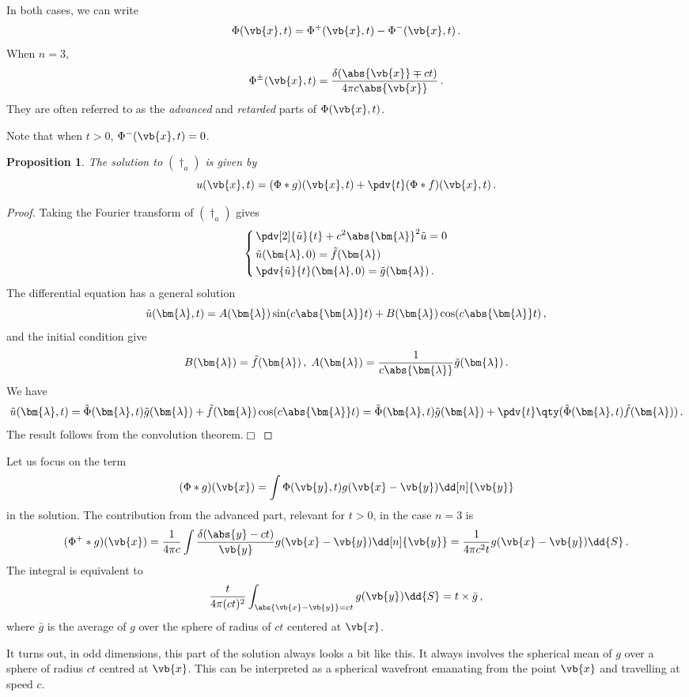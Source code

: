 \documentclass{article}
\theoremstyle{plain}\theoremheaderfont{\normalfont\itshape}\theorembodyfont{\rmfamily}\theoremseparator{.}\newtheorem*{rem}{Remark}\newtheorem*{ex}{Example}\newtheorem*{proof}{Proof}\newtheorem*{altp}{Alternative proof}
\theoremstyle{plain}\theoremheaderfont{\normalfont\bfseries}\theorembodyfont{\rmfamily}\theoremseparator{.}\newtheorem{thm}{Theorem}[section]\newtheorem{lem}[thm]{Lemma}\newtheorem{prop}[thm]{Proposition}\newtheorem*{cor}{Corollary}\newtheorem{defn}[thm]{Definition}\newtheorem{clm}[thm]{Claim}\newtheorem{clminproof}{Claim}
\theoremstyle{break}\theoremheaderfont{\normalfont\itshape}\theorembodyfont{\rmfamily}\theoremseparator{.\medskip}\newtheorem*{proofskip}{Proof}\newtheorem*{exs}{Examples}\newtheorem*{rems}{Remarks}
\theoremstyle{break}\theoremheaderfont{\normalfont\bfseries}\theorembodyfont{\rmfamily}\theoremseparator{.\medskip}\newtheorem{lemskip}[thm]{Lemma}\newtheorem{defnskip}[thm]{Definition}\newtheorem{propskip}[thm]{Proposition}\newtheorem{thmskip}[thm]{Theorem}
\numberwithin{equation}{section}
\newcommand{\qed}{\hfill\ensuremath{\Box}}
\newcommand{\bl}{\bm{\lambda}}
\begin{document}
	In both cases, we can write
	\[\Phi(\vb{x},t)=\Phi^+(\vb{x},t)-\Phi^-(\vb{x},t)\,.\]
	When \(n=3\),
	\[\Phi^\pm(\vb{x},t)=\frac{\delta(\abs{\vb{x}}\mp ct)}{4\pi c\abs{\vb{x}}}\,.\]
	They are often referred to as the \textit{advanced} and \textit{retarded} parts of \(\Phi(\vb{x},t)\). 

	Note that when \(t>0\), \(\Phi^-(\vb{x},t)=0\).
	
	\begin{prop}
		The solution to \((\dagger_a)\) is given by
		\[u(\vb{x},t)=(\Phi*g)(\vb{x},t)+\pdv{t}(\Phi*f)(\vb{x},t)\,.\]
	\end{prop}
	\begin{proof}
		Taking the Fourier transform of \((\dagger_a)\) gives
		\[\left\{\begin{aligned}
			&\,\pdv[2]{\tilde{u}}{t}+c^2\abs{\bl}^2\tilde{u}=0\\
			&\,\tilde{u}(\bl,0)=\tilde{f}(\bl)\\
			&\,\pdv{\tilde{u}}{t}(\bl,0)=\tilde{g}(\bl)\,.
		\end{aligned}\right.\]
		The differential equation has a general solution
		\[\tilde{u}(\bl,t)=A(\bl)\sin(c\abs{\bl}t)+B(\bl)\cos(c\abs{\bl}t)\,,\]
		and the initial condition give
		\[B(\bl)=\tilde{f}(\bl)\,,\;A(\bl)=\frac{1}{c\abs{\bl}}\tilde{g}(\bl)\,.\]
		We have
		\[\tilde{u}(\bl,t)=\tilde{\Phi}(\bl,t)\tilde{g}(\bl)+\tilde{f}(\bl)\cos(c\abs{\bl}t)=\tilde{\Phi}(\bl,t)\tilde{g}(\bl)+\pdv{t}\qty(\tilde{\Phi}(\bl,t)\tilde{f}(\bl))\,.\]
		The result follows from the convolution theorem.\qed
	\end{proof}

	Let us focus on the term
	\[(\Phi*g)(\vb{x})=\int\Phi(\vb{y},t)g(\vb{x}-\vb{y})\dd[n]{\vb{y}}\]
	in the solution. The contribution from the advanced part, relevant for \(t>0\), in the case \(n=3\) is
	\[(\Phi^+*g)(\vb{x})=\frac{1}{4\pi c}\int\frac{\delta(\abs{y}-ct)}{\vb{y}}g(\vb{x}-\vb{y})\dd[n]{\vb{y}}=\frac{1}{4\pi c^2t}g(\vb{x}-\vb{y})\dd{S}\,.\]
	The integral is equivalent to
	\[\frac{t}{4\pi(ct)^2}\int_{\abs{\vb{x}-\vb{y}}=ct}g(\vb{y})\dd{S}=t\times\bar{g}\,,\]
	where \(\bar{g}\) is the average of \(g\) over the sphere of radius of \(ct\) centered at \(\vb{x}\).

	It turns out, in odd dimensions, this part of the solution always looks a bit like this. It always involves the spherical mean of \(g\) over a sphere of radius \(ct\) centred at \(\vb{x}\). This can be interpreted as a spherical wavefront emanating from the point \(\vb{x}\) and travelling at speed \(c\).
\end{document}
